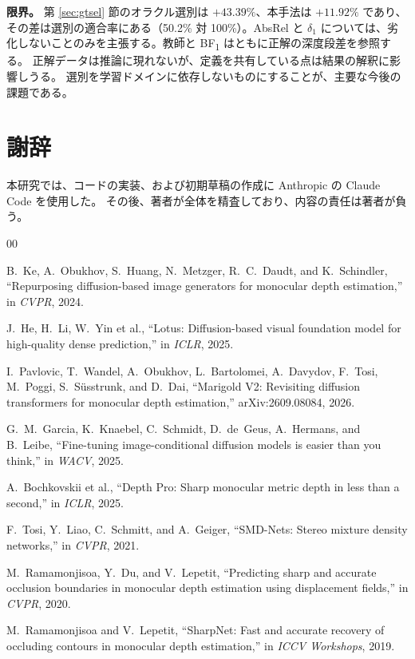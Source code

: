 \documentclass[conference]{IEEEtran}
\newcommand{\bfone}{BF\textsubscript{1}}
\begin{document}
\textbf{限界。} 第 \ref{sec:gtsel} 節のオラクル選別は $+43.39\%$、本手法は
$+11.92\%$ であり、その差は選別の適合率にある（50.2\% 対 100\%）。AbsRel と $\delta_1$
については、劣化しないことのみを主張する。教師と \bfone{} はともに正解の深度段差を参照する。
正解データは推論に現れないが、定義を共有している点は結果の解釈に影響しうる。
選別を学習ドメインに依存しないものにすることが、主要な今後の課題である。

\section*{謝辞}

本研究では、コードの実装、および初期草稿の作成に Anthropic の Claude Code を使用した。
その後、著者が全体を精査しており、内容の責任は著者が負う。

\begin{thebibliography}{00}

 B.~Ke, A.~Obukhov, S.~Huang, N.~Metzger, R.~C.~Daudt, and
K.~Schindler, ``Repurposing diffusion-based image generators for monocular depth
estimation,'' in \emph{CVPR}, 2024.

 J.~He, H.~Li, W.~Yin et al., ``Lotus: Diffusion-based visual
foundation model for high-quality dense prediction,'' in \emph{ICLR}, 2025.

 I.~Pavlovic, T.~Wandel, A.~Obukhov, L.~Bartolomei,
A.~Davydov, F.~Tosi, M.~Poggi, S.~S\"usstrunk, and D.~Dai, ``Marigold V2:
Revisiting diffusion transformers for monocular depth estimation,''
arXiv:2609.08084, 2026.

 G.~M.~Garcia, K.~Knaebel, C.~Schmidt, D.~de~Geus,
A.~Hermans, and B.~Leibe, ``Fine-tuning image-conditional diffusion models is
easier than you think,'' in \emph{WACV}, 2025.

 A.~Bochkovskii et al., ``Depth Pro: Sharp monocular metric
depth in less than a second,'' in \emph{ICLR}, 2025.

 F.~Tosi, Y.~Liao, C.~Schmitt, and A.~Geiger, ``SMD-Nets:
Stereo mixture density networks,'' in \emph{CVPR}, 2021.

 M.~Ramamonjisoa, Y.~Du, and V.~Lepetit, ``Predicting
sharp and accurate occlusion boundaries in monocular depth estimation using
displacement fields,'' in \emph{CVPR}, 2020.

 M.~Ramamonjisoa and V.~Lepetit, ``SharpNet: Fast and accurate
recovery of occluding contours in monocular depth estimation,'' in \emph{ICCV
Workshops}, 2019.


\end{thebibliography}
\end{document}
